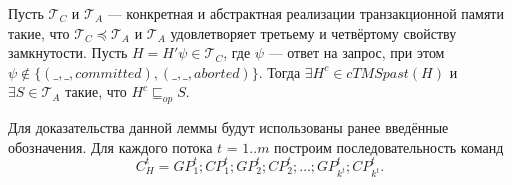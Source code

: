 \begin{lemma}\label{necessity2}
Пусть $\mathcal{T}_C$ и $\mathcal{T}_A$ --- конкретная и абстрактная реализации транзакционной памяти такие, что $\mathcal{T}_C \preceq \mathcal{T}_A$ и $\mathcal{T}_A$ удовлетворяет третьему и четвёртому свойству замкнутости. Пусть $H = H'\psi \in \mathcal{T}_C$, где $\psi$ --- ответ на запрос, при этом $\psi \notin \{(\_,\_,committed),(\_,\_,aborted)\}$. Тогда $\exists H^c \in cTMSpast(H)$ и $\exists S \in \mathcal{T}_A$ такие, что $H^c \sqsubseteq_{op} S$.
\end{lemma}
\begin{myproof}
Для доказательства данной леммы будут использованы ранее введённые обозначения. Для каждого потока $t$ = $1..m$ построим последовательность команд $$C^t_H = GP^t_1;CP^t_1;GP^t_2;CP^t_2;\ldots;GP^t_{k^t};CP^t_{k^t}.$$


\end{myproof}

